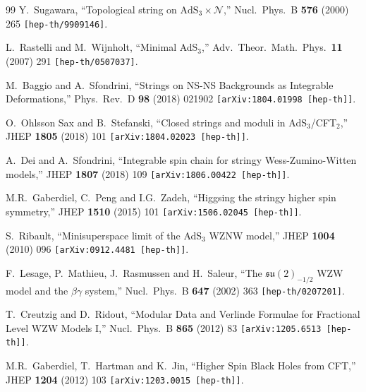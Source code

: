 \documentclass[12pt,a4paper]{article}
\begin{document}
\begin{thebibliography}{99}
Y.~Sugawara,
``Topological string on $\mathrm{AdS}_3 \times \mathcal{N}$,''
Nucl.\ Phys.\ B {\bf 576} (2000) 265
{\tt [hep-th/9909146]}.
   
  L.~Rastelli and M.~Wijnholt,
  ``Minimal AdS$_3$,''
  Adv.\ Theor.\ Math.\ Phys.\  {\bf 11} (2007) 291 
 {\tt  [hep-th/0507037]}.
 
  M.~Baggio and A.~Sfondrini,
  ``Strings on NS-NS Backgrounds as Integrable Deformations,''
  Phys.\ Rev.\ D {\bf 98} (2018) 021902 
{\tt  [arXiv:1804.01998 [hep-th]]}.

  O.~Ohlsson Sax and B.~Stefanski,
  ``Closed strings and moduli in AdS$_{3}$/CFT$_{2}$,''
  JHEP {\bf 1805} (2018) 101 
{\tt  [arXiv:1804.02023 [hep-th]]}.
   
  A.~Dei and A.~Sfondrini,
  ``Integrable spin chain for stringy Wess-Zumino-Witten models,''
  JHEP {\bf 1807} (2018) 109 
{\tt  [arXiv:1806.00422 [hep-th]]}. 

  M.R.~Gaberdiel, C.~Peng and I.G.~Zadeh,
  ``Higgsing the stringy higher spin symmetry,''
  JHEP {\bf 1510} (2015) 101 
{\tt  [arXiv:1506.02045 [hep-th]]}.


       
S.~Ribault,
``Minisuperspace limit of the AdS$_3$ WZNW model,''
JHEP {\bf 1004} (2010) 096
{\tt [arXiv:0912.4481 [hep-th]]}.

F.~Lesage, P.~Mathieu, J.~Rasmussen and H.~Saleur,
``The $\mathfrak{su}(2)_{-1/2}$ WZW model and the $\beta\gamma$ system,''
Nucl.\ Phys.\ B {\bf 647} (2002) 363
{\tt [hep-th/0207201]}.
  
T.~Creutzig and D.~Ridout,
``Modular Data and Verlinde Formulae for Fractional Level WZW Models I,''
Nucl.\ Phys.\ B {\bf 865} (2012) 83
{\tt [arXiv:1205.6513 [hep-th]]}.
  
M.R.~Gaberdiel, T.~Hartman and K.~Jin,
``Higher Spin Black Holes from CFT,''
JHEP {\bf 1204} (2012) 103
{\tt [arXiv:1203.0015 [hep-th]]}.


\end{thebibliography}
\end{document}
